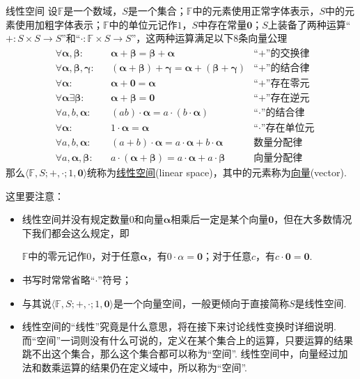 \documentclass[main.tex]{subfiles}
\begin{document}
\begin{definition}{线性空间}
    设\(\mathbb F\)是一个数域，\(S\)是一个集合；\(\mathbb{F}\)中的元素使用正常字体表示，\(S\)中的元素使用加粗字体表示；\(\mathbb{F}\)中的单位元记作\(1\)，\(S\)中存在常量\(\bm 0\)；\(S\)上装备了两种运算“\(+:S \times S \to S\)”和“\(\cdot: \mathbb F \times S \to S\)”，这两种运算满足以下8条向量公理
    \[
        \begin{aligned}
            & \forall \bm\alpha,\bm\beta: &&\bm\alpha + \bm\beta = \bm\beta + \bm\alpha & \mbox{“}+\mbox{”的交换律} \\
            & \forall \bm\alpha,\bm\beta,\bm\gamma: &&(\bm\alpha + \bm\beta) + \bm\gamma = \bm\alpha + (\bm\beta + \bm\gamma) & \mbox{“}+\mbox{”的结合律} \\
            & \forall \bm\alpha: &&\bm\alpha + \bm 0 = \bm\alpha & \mbox{“}+\mbox{”存在零元} \\
            & \forall \bm\alpha \exists \bm\beta: &&\bm\alpha + \bm\beta = \bm 0 & \mbox{“}+\mbox{”存在逆元} \\
            & \forall a,b,\bm\alpha: &&(ab) \cdot \bm\alpha = a \cdot (b \cdot \bm\alpha) & \mbox{“}\cdot\mbox{”的结合律} \\
            & \forall \bm\alpha: &&1 \cdot \bm\alpha = \bm\alpha & \mbox{“}\cdot\mbox{”存在单位元} \\
            & \forall a,b,\bm\alpha: &&(a+b)\cdot\bm\alpha = a \cdot \bm\alpha + b \cdot \bm\alpha & \mbox{数量分配律} \\
            & \forall a,\bm\alpha,\bm\beta: &&a\cdot(\bm\alpha+\bm\beta) = a \cdot \bm\alpha + a \cdot \bm\beta & \mbox{向量分配律}
        \end{aligned}
    \]
    那么\(\langle \mathbb{F}, S;+,\cdot;1,\bm 0\rangle\)统称为\uline{线性空间}(linear space)，其中的元素称为\uline{向量}(vector).
\end{definition}

这里要注意：
\begin{itemize}
    \item [(1)] 线性空间并没有规定数量\(0\)和向量\(\bm\alpha\)相乘后一定是某个向量\(\bm 0\)，但在大多数情况下我们都会这么规定，即
    \begin{reference}
        \(\mathbb{F}\)中的零元记作\(0\)，对于任意\(\bm\alpha\)，有\(0\cdot \alpha = \bm 0\)；对于任意\(c\)，有\(c\cdot\bm 0 = \bm 0\).
    \end{reference}
    \item [(2)] 书写时常常省略“\(\cdot\)”符号；
    \item [(3)] 与其说\(\langle \mathbb{F}, S;+,\cdot;1,\bm 0\rangle\)是一个向量空间，一般更倾向于直接简称\(S\)是线性空间.
    \item [(4)] 线性空间的“线性”究竟是什么意思，将在接下来讨论线性变换时详细说明. 而“空间”一词则没有什么可说的，定义在某个集合上的运算，只要运算的结果跳不出这个集合，那么这个集合都可以称为“空间”. 线性空间中，向量经过加法和数乘运算的结果仍在定义域中，所以称为“空间”.
\end{itemize}
\end{document}
